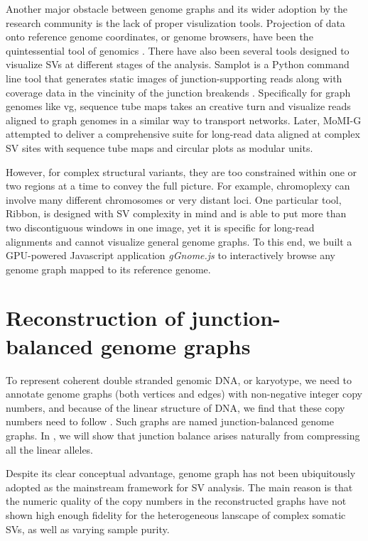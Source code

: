 \documentclass[phd,tocprelim]{cornell}
\begin{document}
Another major obstacle between genome graphs and its wider adoption by the research community is the lack of proper visulization tools. Projection of data onto reference genome coordinates, or genome browsers, have been the quintessential tool of genomics \cite{Robinson2011-ra,kent2002-ke}. There have also been several tools designed to visualize SVs at different stages of the analysis. Samplot is a Python command line tool that generates static images of junction-supporting reads along with coverage data in the vincinity of the junction breakends \cite{Belyeu2021-tm}. Specifically for graph genomes like vg, sequence tube maps \cite{Beyer2019-nb} takes an creative turn and visualize reads aligned to graph genomes in a similar way to transport networks. Later, MoMI-G \cite{Yokoyama2019-xd} attempted to deliver a comprehensive suite for long-read data aligned at complex SV sites with sequence tube maps and circular plots as modular units.

However, for complex structural variants, they are too constrained within one or two regions at a time to convey the full picture. For example, chromoplexy can involve many different chromosomes or very distant loci. One particular tool, Ribbon\cite{Nattestad2016-dn,Nattestad2018-wl}, is designed with SV complexity in mind and is able to put more than two discontiguous windows in one image, yet it is specific for long-read alignments and cannot visualize general genome graphs. To this end, we built a GPU-powered Javascript application \textit{gGnome.js} to interactively browse any genome graph mapped to its reference genome.

\section{Reconstruction of junction-balanced genome graphs}
To represent coherent double stranded genomic DNA, or karyotype, we need to annotate genome graphs (both vertices and edges) with non-negative integer copy numbers, and because of the linear structure of DNA, we find that these copy numbers need to follow . Such graphs are named junction-balanced genome graphs. In , we will show that junction balance arises naturally from compressing all the linear alleles.

Despite its clear conceptual advantage, genome graph has not been ubiquitously adopted as the mainstream framework for SV analysis. The main reason is that the numeric quality of the copy numbers in the reconstructed graphs have not shown high enough fidelity for the heterogeneous lanscape of complex somatic SVs, as well as varying sample purity. 
\end{document}
